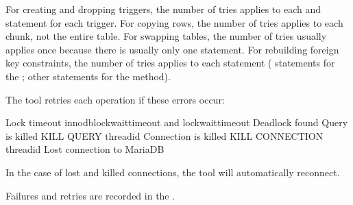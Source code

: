 \documentclass[letterpaper,10pt,english]{sphinxmanual}
\begin{document}
\begin{fulllineitems}
For creating and dropping triggers, the number of tries applies to each
 and  statement for each trigger.
For copying rows, the number of tries applies to each chunk, not the
entire table.  For swapping tables, the number of tries usually applies
once because there is usually only one  statement.
For rebuilding foreign key constraints, the number of tries applies to
each statement ( statements for the 
{\hyperref[\detokenize{mariadb-schema-change:cmdoption-mariadb-schema-change-alter-foreign-keys-method}]{}}; other statements for the 
method).

The tool retries each operation if these errors occur:

\begin{sphinxVerbatim}[commandchars=\\\{\}]
Lock  timeout innodb\PYGZus{}lock\PYGZus{}wait\PYGZus{}timeout and lock\PYGZus{}wait\PYGZus{}timeout
Deadlock found
Query is killed KILL QUERY \PYGZlt{}thread\PYGZus{}id\PYGZgt{}
Connection is killed KILL CONNECTION \PYGZlt{}thread\PYGZus{}id\PYGZgt{}
Lost connection to MariaDB
\end{sphinxVerbatim}

In the case of lost and killed connections, the tool will automatically
reconnect.

Failures and retries are recorded in the {\hyperref[\detokenize{mariadb-schema-change:cmdoption-mariadb-schema-change-statistics}]{}}.

\end{fulllineitems}

\end{document}
